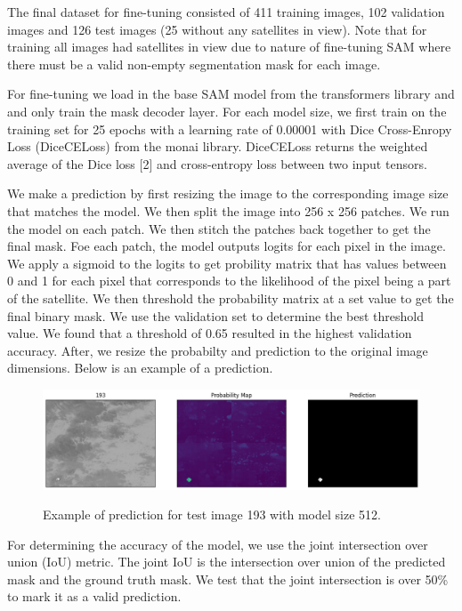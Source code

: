 \documentclass{article}
\begin{document}
The final dataset for fine-tuning consisted of 411 training images, 102 validation images and 126 test images (25 without any satellites in view). Note that for training all images had satellites in view due to nature of fine-tuning SAM where there must be a valid non-empty segmentation mask for each image. 

For fine-tuning we load in the base SAM model from the transformers library and and only train the mask decoder layer. For each model size, we first train on the training set for 25 epochs with a learning rate of 0.00001 with Dice Cross-Enropy Loss (DiceCELoss) from the monai library. DiceCELoss returns the weighted average of the Dice loss [2] and cross-entropy loss between two input tensors. 

We make a prediction by first resizing the image to the corresponding image size that matches the model. We then split the image into 256 x 256 patches. We run the model on each patch. We then stitch the patches back together to get the final mask. Foe each patch, the model outputs logits for each pixel in the image. We apply a sigmoid to the logits to get probility matrix that has values between 0 and 1 for each pixel that corresponds to the likelihood of the pixel being a part of the satellite. We then threshold the probability matrix at a set value to get the final binary mask. We use the validation set to determine the best threshold value. We found that a threshold of 0.65 resulted in the highest validation accuracy. After, we resize the probabilty and prediction to the original image dimensions. Below is an example of a prediction.

\begin{figure}[H]
    \centering
    \includegraphics[width=1\textwidth]{figs/pred.png}\\
    \captionsetup{width=.8\linewidth} 
    \caption{Example of prediction for test image 193 with model size 512.}
\end{figure}

For determining the accuracy of the model, we use the joint intersection over union (IoU) metric. The joint IoU is the intersection over union of the predicted mask and the ground truth mask. We test that the joint intersection is over 50\% to mark it as a valid prediction. 
\end{document}

